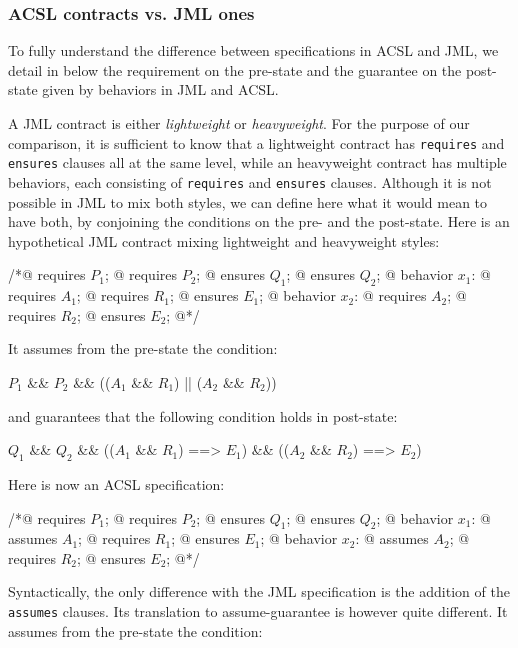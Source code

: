 \subsubsection*{ACSL contracts vs. JML ones}

To fully understand the difference between specifications in ACSL and
JML, we detail in below the requirement on the pre-state and
the guarantee on the post-state given by behaviors in JML and ACSL.

A JML contract is either \emph{lightweight} or \emph{heavyweight}.
For the purpose of our comparison, it is sufficient to know that a
lightweight contract has \lstinline|requires| and \lstinline|ensures| clauses
all at the same level, while an heavyweight contract has multiple
behaviors, each consisting of \lstinline|requires| and \lstinline|ensures|
clauses. Although it is not possible in JML to mix both styles, we can
define here what it would mean to have both, by conjoining the
conditions on the pre- and the post-state.
Here is an hypothetical JML contract mixing lightweight and
heavyweight styles:
\begin{listing}{1}
/*@ requires $P_1$;
  @ requires $P_2$;
  @ ensures  $Q_1$;
  @ ensures  $Q_2$;
  @ behavior $x_1$:
  @   requires $A_1$;
  @   requires $R_1$;
  @   ensures $E_1$;
  @ behavior $x_2$:
  @   requires $A_2$;
  @   requires $R_2$;
  @   ensures $E_2$;
  @*/
\end{listing}
It assumes from the pre-state the condition:
\begin{listing-nonumber}
$P_1$ && $P_2$ && (($A_1$ && $R_1$) || ($A_2$ && $R_2$))
\end{listing-nonumber}
and guarantees that the following condition holds in post-state:
\begin{listing-nonumber}
$Q_1$ && $Q_2$ &&
  (\old($A_1$ && $R_1$) ==> $E_1$) && (\old($A_2$ && $R_2$) ==> $E_2$)
\end{listing-nonumber}


Here is now an ACSL specification:

\begin{listing}{1}
/*@ requires $P_1$;
  @ requires $P_2$;
  @ ensures  $Q_1$;
  @ ensures  $Q_2$;
  @ behavior $x_1$:
  @   assumes $A_1$;
  @   requires $R_1$;
  @   ensures $E_1$;
  @ behavior $x_2$:
  @   assumes $A_2$;
  @   requires $R_2$;
  @   ensures $E_2$;
  @*/
\end{listing}

\noindent
Syntactically, the only difference with the JML specification is the
addition of the \lstinline|assumes| clauses.
Its translation to assume-guarantee is however quite different.
It assumes from the pre-state the condition:

